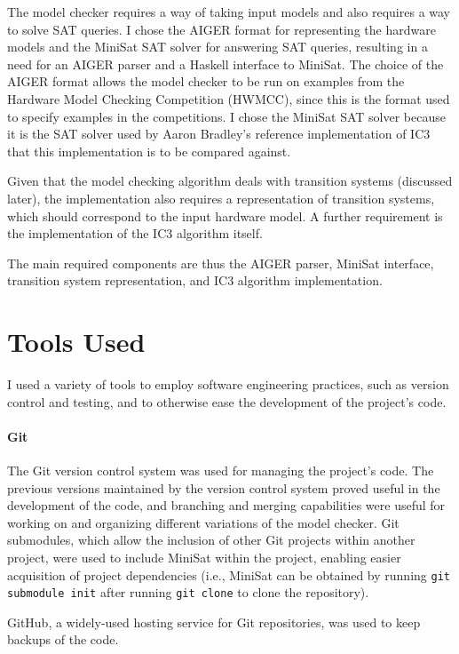 \documentclass[12pt,a4paper,twoside,openright]{report}
\begin{document}

The model checker requires a way of taking input models and also
requires a way to solve SAT queries.
I chose the AIGER format for representing the hardware models and the
MiniSat SAT solver for answering SAT queries, resulting in a need for an
AIGER parser and a Haskell interface to MiniSat. The choice of
the AIGER format allows the model checker to be run on examples from
the Hardware Model Checking Competition (HWMCC), since this is the format used
to specify examples in the competitions. I chose the MiniSat SAT
solver because it is the SAT solver used by Aaron Bradley's reference
implementation of IC3 that this implementation is to be compared against.

Given that the model checking algorithm deals with transition systems
(discussed later), the implementation also requires a representation of
transition systems, which should correspond to the input hardware model.
A further requirement is the implementation of the
IC3 algorithm itself.

The main required components are thus the AIGER parser, MiniSat interface,
transition system representation, and IC3 algorithm implementation.

\section{Tools Used}

I used a variety of tools to employ software engineering practices, such
as version control and testing, and to otherwise ease the development of
the project's code.

\paragraph{Git}{
The Git version control system was used for managing the project's code. The
previous versions maintained by the version control system proved useful in
the development of the code, and branching and merging capabilities were
useful for working on and organizing different variations of the model checker.
Git submodules, which allow the inclusion of other Git projects within another
project, were used to include MiniSat within the project, enabling easier
acquisition of project dependencies (i.e., MiniSat can be obtained by running
\verb,git submodule init, after running \verb,git clone, to clone the repository).

GitHub, a widely-used hosting service for Git repositories, was used to keep
backups of the code.}
\end{document}

